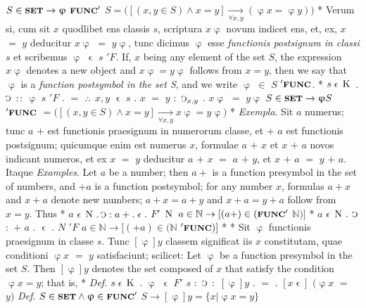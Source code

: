 \documentclass{book}
\newcommand{\C}{\mathop{\sbox0{$\displaystyle$$\reflectbox{C}$} %
\raisebox{-\height+\ht0-0.05cm}[\ht0][\dp0]{\scalebox{0.8}[0.8]{\copy0}}}\displaylimits} %
\newcommand{\pppNoSpace}{\leavevmode\lower0ex\hbox{.}\kern-0.1em\raise0.7ex\hbox{.}\kern-0.1em\lower0ex\hbox{.}} %
\newcommand{\smallIn}{\ensuremath{\mathrel{\epsilon}}}
\newcommand{\K}{\mathop{\thinspace \text{K} \thinspace}}
\newcommand{\N}{\mathop{\thinspace \text{N} \thinspace}}
\newcommand{\setOfSets}{\mathord{\text{{\footnotesize \textbf{SET}}}}}
\newcommand{\func}{\mathord{\text{{\footnotesize \textbf{FUNC}}}}}
\newenvironment{translateTwoCol}
               { %
                 \columnratio{0.5, 0.5} \begin{paracol}{2}
                 \newcommand{\LAT}{\switchcolumn[0]*}
                 \newcommand{\ENG}{\switchcolumn[1]}
               }
               { %
                 \let\ENG\undefined
                 \let\LAT\undefined
                 \end{paracol}
               }
\begin{document}
\begin{translateTwoCol}
\ENG
\hspace{1.06cm} $S \in \setOfSets \rightarrow \upvarphi$ $\func'$ $S = \big( [(x,y \in S) \wedge x = y] \xrightarrow[\forall x,y]{} ( \upvarphi x = \upvarphi y) \big)$
\LAT
Verum si, cum sit $x$ quodlibet ens classis $s$, scriptura $x\upvarphi$ novum indicet ens, et, ex, $x$ $=$ $y$ deducitur $x\upvarphi$ $=$ $y\upvarphi$, tunc dicimus $\upvarphi$ esse \emph{functionis postsignum in classi} $s$ et scribemus $\upvarphi$ $\smallIn$ $s$ $'F$.
\ENG
If, $x$ being any element of the set $S$, the expression $x\upvarphi$ denotes a new object and $x\upvarphi = y\upvarphi$ follows from $x=y$, then we say that $\upvarphi$ is a \emph{function postsymbol in the set S}, and we write $\upvarphi$ $\in$ $S$ $'\func$.
\LAT
\hspace{1.06cm} $s \smallIn \K$ $.$ $\C$ $:\hspace{0.1em}:$ $\upvarphi$ $s$ $'F$ $.$ $=$ $\pppNoSpace$ $x,y$ $\smallIn$ $s$ $.$ $x$ $=$ $y$ $:$ $\C_{x,y}$ $.$ $x\upvarphi$ $=$ $y\upvarphi$
\ENG
\hspace{1.06cm} $S \in \setOfSets \rightarrow \upvarphi S$ $'\func$ $= \big( [(x,y \in S) \wedge x=y] \xrightarrow[\forall x,y]{} x\upvarphi=y\upvarphi \big)$
\LAT
\emph{Exempla}. Sit $a$ numerus; tunc $a$ $+$ est functionis praesignum in numerorum classe, et $+$ $a$ est functionis postsignum; quicumque enim est numerus $x$, formulae $a$ $+$ $x$ et $x$ $+$ $a$ novos indicant numeros, et ex $x$ $=$ $y$ deducitur $a$ $+$ $x$ $=$ $a$ $+$ $y$, et $x$ $+$ $a$ $=$ $y$ $+$ $a$. Itaque
\ENG
\emph{Examples}. Let $a$ be a number; then $a+$ is a function presymbol in the set of numbers, and $+a$ is a function postsymbol; for any number $x$, formulas $a+x$ and $x+a$ denote new numbers; $a+x=a+y$ and $x+a=y+a$ follow from $x=y$. Thus
\LAT
\hspace{1.06cm} $a$ $\smallIn \N . \C : a + . \smallIn .$ $F'$ $\N$
\ENG
\hspace{1.06cm} $a \in \mathbb{N} \rightarrow [(a +) \in (\func'$ $\mathbb{N})]$
\LAT
\hspace{1.06cm} $a$ $\smallIn \N .$ $\C$ $:$ $+$ $a$ $.$ $\smallIn$ $.$ $N$ $'F$
\ENG
\hspace{1.06cm} $a \in \mathbb{N} \rightarrow [(+ a) \in (\mathbb{N}$ $'\func)]$
\LAT
\hfill
\ENG
\hfill
\LAT
Sit $\upvarphi$ functionis praesignum in classe $s$. Tunc $[\upvarphi] y$ classem significat iis $x$ constitutam, quae conditioni $\upvarphi x$ $=$ $y$ satisfaciunt; scilicet:
\ENG
Let $\upvarphi$ be a function presymbol in the set $S$. Then $[\upvarphi] y$ denotes the set composed of $x$ that satisfy the condition $\upvarphi x = y$; that is,
\LAT
\emph{Def}. \hspace{0.25cm} $s \smallIn \K$ $.$ $\upvarphi$ $\smallIn$ $F'$ $s$ $:$ $\C$ $:$ $[\upvarphi]y$ $.$ $=$ $.$ $[x \smallIn]$ $(\upvarphi x$ $=$ $y)$
\ENG
\emph{Def}. \hspace{0.25cm} $S \in \setOfSets \wedge \upvarphi \in \func'$ $S \rightarrow [\upvarphi]y = \{ x | \upvarphi x=y\}$
\end{translateTwoCol}
\end{document}

